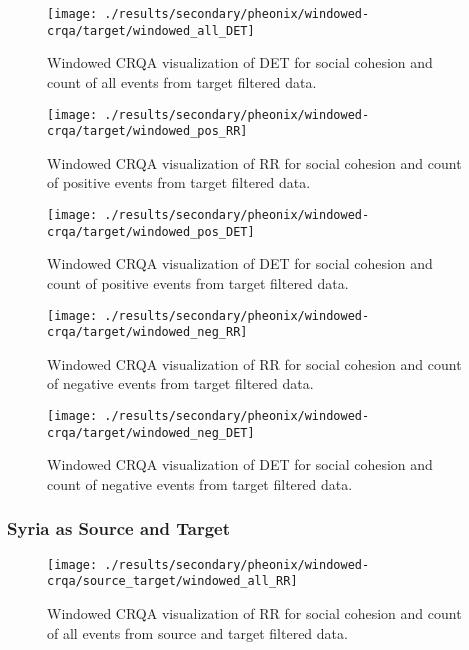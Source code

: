 \documentclass[english,man]{apa6}
\begin{document}
\begin{figure}
\texttt{[image: ./results/secondary/pheonix/windowed-crqa/target/windowed\_all\_DET]} \caption{Windowed CRQA visualization of DET for social cohesion and count of all events from target filtered data.}\label{fig:plot-DET-targ-all-secondary-pheonix}
\end{figure}

\begin{figure}
\texttt{[image: ./results/secondary/pheonix/windowed-crqa/target/windowed\_pos\_RR]} \caption{Windowed CRQA visualization of RR for social cohesion and count of positive events from target filtered data.}\label{fig:plot-RR-targ-pos-secondary-pheonix}
\end{figure}

\begin{figure}
\texttt{[image: ./results/secondary/pheonix/windowed-crqa/target/windowed\_pos\_DET]} \caption{Windowed CRQA visualization of DET for social cohesion and count of positive events from target filtered data.}\label{fig:plot-DET-targ-pos-secondary-pheonix}
\end{figure}

\begin{figure}
\texttt{[image: ./results/secondary/pheonix/windowed-crqa/target/windowed\_neg\_RR]} \caption{Windowed CRQA visualization of RR for social cohesion and count of negative events from target filtered data.}\label{fig:plot-RR-targ-neg-secondary-pheonix}
\end{figure}

\begin{figure}
\texttt{[image: ./results/secondary/pheonix/windowed-crqa/target/windowed\_neg\_DET]} \caption{Windowed CRQA visualization of DET for social cohesion and count of negative events from target filtered data.}\label{fig:plot-DET-targ-neg-secondary-pheonix}
\end{figure}

\hypertarget{syria-as-source-and-target-4}{%
\subsubsection{Syria as Source and Target}\label{syria-as-source-and-target-4}}

\begin{figure}
\texttt{[image: ./results/secondary/pheonix/windowed-crqa/source\_target/windowed\_all\_RR]} \caption{Windowed CRQA visualization of RR for social cohesion and count of all events from source and target filtered data.}\label{fig:plot-RR-source-targ-all-secondary-pheonix}
\end{figure}
\end{document}
